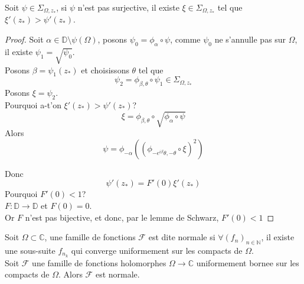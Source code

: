 \documentclass[../main.tex]{subfiles}
\begin{document}
\begin{lemma}
Soit $\psi\in \Sigma_{\Omega,z_*} $, si $\psi$ n'est pas surjective, il existe $\xi\in \Sigma_{\Omega,z_*} $ tel que $\xi'( z_*)> \psi'( z_*)  $.
\end{lemma}
\begin{proof}
Soit $\alpha\in  \mathbb{D}\setminus \psi( \Omega) $, posons $\psi_0= \phi_\alpha\circ\psi$, comme $\psi_0$ ne s'annulle pas sur $\Omega$, il existe $\psi_1= \sqrt{\psi_0} $.\\
Posons $\beta= \psi_1( z_*) $ et choisissons $\theta$ tel que
\[ 
\psi_2= \phi_{\beta,\theta} \circ\psi_1\in \Sigma_{\Omega,z_*} 
\]
Posons $\xi= \psi_2$.\\
Pourquoi a-t'on $\xi'( z_*) >\psi'( z_*) $?\\
\[ 
\xi= \phi_{\beta,\theta} \circ \sqrt{\phi_{\alpha} \circ\psi} 
\]
Alors
\[ 
\psi = \phi_{-\alpha} \left( ( \phi_{- e^{i\beta} \theta,-\theta}\circ\xi ) ^{2} \right)
\]

Donc
\[ 
\psi'( z_*) = F'( 0) \xi'( z_*) 
\]
Pourquoi $F'( 0) <1$?\\
$F:\mathbb{D}\to \mathbb{D}$ et $F( 0) =0$.\\
Or $F$ n'est pas bijective, et donc, par le lemme de Schwarz, $F'( 0) < 1$

\end{proof}
\begin{defn}
	Soit $\Omega \subset \mathbb{C}$, une famille de fonctions $ \mathcal{F}$ est dite normale si $\forall ( f_n)_{n\in \mathbb{N}} $, il existe une sous-suite $f_{n_k} $ qui converge uniformement sur les compacts de $\Omega$.\\
	Soit $ \mathcal{F}$ une famille de fonctions holomorphes $\Omega\to \mathbb{C}$ uniformement bornee sur les compacts de $\Omega$. Alors $ \mathcal{F}$ est normale.
\end{defn}
\end{document}
